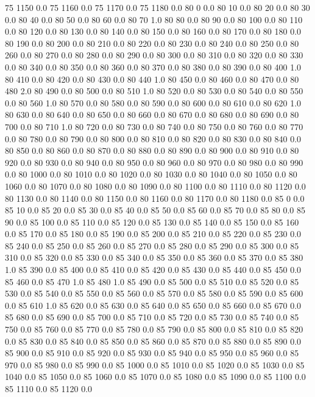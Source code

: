 75	1150	0.0
75	1160	0.0
75	1170	0.0
75	1180	0.0
80	0	0.0
80	10	0.0
80	20	0.0
80	30	0.0
80	40	0.0
80	50	0.0
80	60	0.0
80	70	1.0
80	80	0.0
80	90	0.0
80	100	0.0
80	110	0.0
80	120	0.0
80	130	0.0
80	140	0.0
80	150	0.0
80	160	0.0
80	170	0.0
80	180	0.0
80	190	0.0
80	200	0.0
80	210	0.0
80	220	0.0
80	230	0.0
80	240	0.0
80	250	0.0
80	260	0.0
80	270	0.0
80	280	0.0
80	290	0.0
80	300	0.0
80	310	0.0
80	320	0.0
80	330	0.0
80	340	0.0
80	350	0.0
80	360	0.0
80	370	0.0
80	380	0.0
80	390	0.0
80	400	1.0
80	410	0.0
80	420	0.0
80	430	0.0
80	440	1.0
80	450	0.0
80	460	0.0
80	470	0.0
80	480	2.0
80	490	0.0
80	500	0.0
80	510	1.0
80	520	0.0
80	530	0.0
80	540	0.0
80	550	0.0
80	560	1.0
80	570	0.0
80	580	0.0
80	590	0.0
80	600	0.0
80	610	0.0
80	620	1.0
80	630	0.0
80	640	0.0
80	650	0.0
80	660	0.0
80	670	0.0
80	680	0.0
80	690	0.0
80	700	0.0
80	710	1.0
80	720	0.0
80	730	0.0
80	740	0.0
80	750	0.0
80	760	0.0
80	770	0.0
80	780	0.0
80	790	0.0
80	800	0.0
80	810	0.0
80	820	0.0
80	830	0.0
80	840	0.0
80	850	0.0
80	860	0.0
80	870	0.0
80	880	0.0
80	890	0.0
80	900	0.0
80	910	0.0
80	920	0.0
80	930	0.0
80	940	0.0
80	950	0.0
80	960	0.0
80	970	0.0
80	980	0.0
80	990	0.0
80	1000	0.0
80	1010	0.0
80	1020	0.0
80	1030	0.0
80	1040	0.0
80	1050	0.0
80	1060	0.0
80	1070	0.0
80	1080	0.0
80	1090	0.0
80	1100	0.0
80	1110	0.0
80	1120	0.0
80	1130	0.0
80	1140	0.0
80	1150	0.0
80	1160	0.0
80	1170	0.0
80	1180	0.0
85	0	0.0
85	10	0.0
85	20	0.0
85	30	0.0
85	40	0.0
85	50	0.0
85	60	0.0
85	70	0.0
85	80	0.0
85	90	0.0
85	100	0.0
85	110	0.0
85	120	0.0
85	130	0.0
85	140	0.0
85	150	0.0
85	160	0.0
85	170	0.0
85	180	0.0
85	190	0.0
85	200	0.0
85	210	0.0
85	220	0.0
85	230	0.0
85	240	0.0
85	250	0.0
85	260	0.0
85	270	0.0
85	280	0.0
85	290	0.0
85	300	0.0
85	310	0.0
85	320	0.0
85	330	0.0
85	340	0.0
85	350	0.0
85	360	0.0
85	370	0.0
85	380	1.0
85	390	0.0
85	400	0.0
85	410	0.0
85	420	0.0
85	430	0.0
85	440	0.0
85	450	0.0
85	460	0.0
85	470	1.0
85	480	1.0
85	490	0.0
85	500	0.0
85	510	0.0
85	520	0.0
85	530	0.0
85	540	0.0
85	550	0.0
85	560	0.0
85	570	0.0
85	580	0.0
85	590	0.0
85	600	0.0
85	610	1.0
85	620	0.0
85	630	0.0
85	640	0.0
85	650	0.0
85	660	0.0
85	670	0.0
85	680	0.0
85	690	0.0
85	700	0.0
85	710	0.0
85	720	0.0
85	730	0.0
85	740	0.0
85	750	0.0
85	760	0.0
85	770	0.0
85	780	0.0
85	790	0.0
85	800	0.0
85	810	0.0
85	820	0.0
85	830	0.0
85	840	0.0
85	850	0.0
85	860	0.0
85	870	0.0
85	880	0.0
85	890	0.0
85	900	0.0
85	910	0.0
85	920	0.0
85	930	0.0
85	940	0.0
85	950	0.0
85	960	0.0
85	970	0.0
85	980	0.0
85	990	0.0
85	1000	0.0
85	1010	0.0
85	1020	0.0
85	1030	0.0
85	1040	0.0
85	1050	0.0
85	1060	0.0
85	1070	0.0
85	1080	0.0
85	1090	0.0
85	1100	0.0
85	1110	0.0
85	1120	0.0
